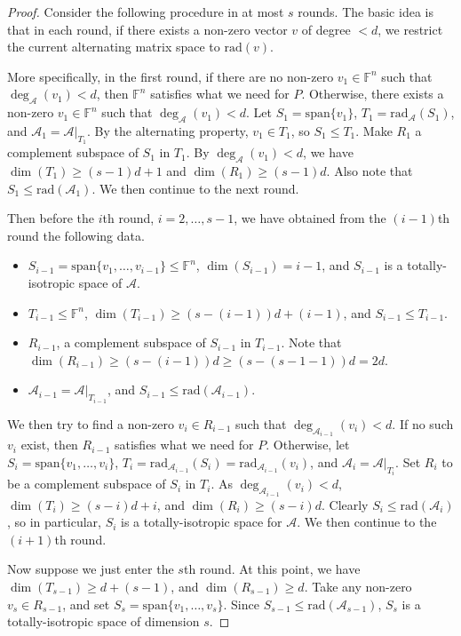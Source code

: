 \documentclass[10pt]{article}
\newcommand{\spa}[1]{\mathcal{#1}}
\newcommand{\F}{\mathbb{F}}
\newcommand{\rad}{\mathrm{rad}}
\renewcommand{\span}{\mathrm{span}}
\newcommand{\cA}{\spa{A}}
\begin{document}
\begin{proof} %
Consider the following 
procedure in at most $s$ rounds. The basic 
idea is that in each round, if there exists a non-zero vector $v$ of degree $<d$, 
we restrict the current alternating matrix space to $\rad(v)$.

More specifically, in the first round, if there are no non-zero $v_1\in\F^n$ 
such that $\deg_\cA(v_1)<d$, then
$\F^n$ satisfies what we need for $P$. Otherwise, there exists a non-zero 
$v_1\in\F^n$ 
such that $\deg_\cA(v_1)<d$. Let $S_1=\span\{ v_1\}$, 
$T_1=\rad_\cA(S_1)$, and $\cA_1=\cA|_{T_1}$. By the alternating 
property, $v_1\in T_1$, so $S_1\leq T_1$. Make $R_1$ a complement subspace 
of $S_1$ in $T_1$. 
%
%
%
%
%
%
%
%
%
%
%
By $\deg_\cA(v_1)<d$, we have $\dim(T_1)\geq 
(s-1)d+1$ and $\dim(R_1)\geq (s-1)d$. Also note that $S_1\leq \rad(\cA_1)$. We 
then 
continue to 
the next round.

%
%
%
%
%
%
%
%
%
%
%
%
%
%
%
%
%
%
%
%
%

Then before the $i$th round, $i=2, \dots, s-1$, we have obtained from the 
$(i-1)$th round the following data.
\begin{itemize}
\item $S_{i-1}=\span\{ v_1, \dots, v_{i-1}\}\leq \F^n$, $\dim(S_{i-1})=i-1$, 
and $S_{i-1}$ is a totally-isotropic space of $\cA$.
\item $T_{i-1}\leq \F^n$, $\dim(T_{i-1})\geq (s-(i-1))d+(i-1)$, and $S_{i-1}\leq 
T_{i-1}$.
\item $R_{i-1}$, a complement subspace of $S_{i-1}$ in $T_{i-1}$. Note that 
$\dim(R_{i-1})\geq (s-(i-1))d\geq (s-(s-1-1))d=2d$.
\item $\cA_{i-1}=\cA|_{T_{i-1}}$, and $S_{i-1}\leq \rad(\cA_{i-1})$.
\end{itemize}
%

We then try to find a non-zero $v_i\in 
R_{i-1}$ such that 
$\deg_{\cA_{i-1}}(v_i)<d$. 
%
%
%
If no such $v_i$ exist, then $R_{i-1}$ satisfies what 
we need for $P$. 
%
Otherwise, let $S_i=\span\{ v_1, \dots, v_i\}$, 
$T_i=\rad_{\cA_{i-1}}(S_i)=\rad_{\cA_{i-1}}( v_i)$, 
and $\cA_i=\cA|_{T_i}$. Set $R_i$ to be a complement subspace of $S_i$ in $T_i$.
As $\deg_{\cA_{i-1}}(v_i)<d$, $\dim(T_i)\geq (s-i)d+i$, and $\dim(R_i)\geq 
(s-i)d$. Clearly $S_i\leq\rad(\cA_i)$, so in particular, $S_i$ is a 
totally-isotropic space for $\cA$.
%
%
We then continue 
to the 
$(i+1)$th round. 

Now suppose we just enter the $s$th round. At this point, we have 
$\dim(T_{s-1})\geq 
d+(s-1)$, and $\dim(R_{s-1})\geq d$. 
%
%
%
Take 
any non-zero $v_s\in R_{s-1}$, and set 
$S_s=\span\{ v_1, \dots, v_s\}$. Since $S_{s-1}\leq\rad(\cA_{s-1})$, 
$S_s$ is 
a totally-isotropic space of 
dimension $s$.
\end{proof}
\end{document}
